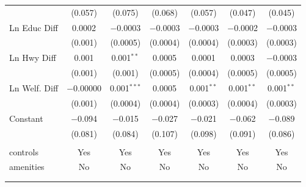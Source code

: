 \begin{table}[!htbp]
\begin{tabular}{@{\extracolsep{5pt}}lcccccc}
  & (0.057) & (0.075) & (0.068) & (0.057) & (0.047) & (0.045) \\ 
  Ln Educ Diff & 0.0002 & $-$0.0003 & $-$0.0003 & $-$0.0003 & $-$0.0002 & $-$0.0003 \\ 
  & (0.001) & (0.0005) & (0.0004) & (0.0004) & (0.0003) & (0.0003) \\ 
  Ln Hwy Diff & 0.001 & 0.001$^{**}$ & 0.0005 & 0.0001 & 0.0003 & $-$0.0003 \\ 
  & (0.001) & (0.001) & (0.0005) & (0.0004) & (0.0005) & (0.0005) \\ 
  Ln Welf. Diff & $-$0.00000 & 0.001$^{***}$ & 0.0005 & 0.001$^{**}$ & 0.001$^{**}$ & 0.001$^{**}$ \\ 
  & (0.001) & (0.0004) & (0.0004) & (0.0003) & (0.0004) & (0.0003) \\ 
  Constant & $-$0.094 & $-$0.015 & $-$0.027 & $-$0.021 & $-$0.062 & $-$0.089 \\ 
  & (0.081) & (0.084) & (0.107) & (0.098) & (0.091) & (0.086) \\ 
 \hline \\[-1.8ex] 
controls & Yes & Yes & Yes & Yes & Yes & Yes \\ 
amenities & No & No & No & No & No & No \\ 
\hline \\[-1.8ex] 
\hline 
\hline \\[-1.8ex] 
\end{tabular} 
\end{table} 

